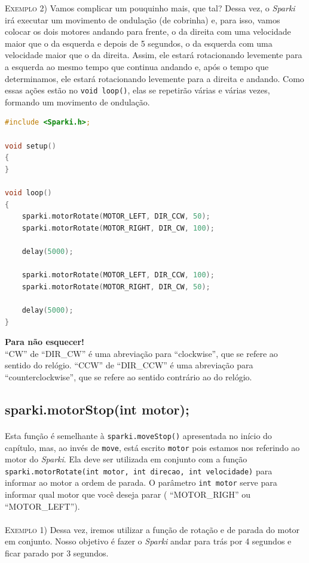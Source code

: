 \textsc{Exemplo 2)} Vamos complicar um pouquinho mais, que tal? Dessa vez, o \textsl{Sparki} irá executar um movimento de ondulação (de cobrinha) e, para isso, vamos colocar os dois motores andando para frente, o da direita com uma velocidade maior que o da esquerda e depois de 5 segundos, o da esquerda com uma velocidade maior que o da direita. Assim, ele estará rotacionando levemente para a esquerda ao mesmo tempo que continua andando e, após o tempo que determinamos, ele estará rotacionando levemente para a direita e andando. Como essas ações estão no \lstinline[columns=fixed]{void loop()}, elas se repetirão várias e várias vezes, formando um movimento de ondulação.

    \begin{lstlisting}[language=C]
#include <Sparki.h>;

void setup()
{
}

void loop()
{
    sparki.motorRotate(MOTOR_LEFT, DIR_CCW, 50);
    sparki.motorRotate(MOTOR_RIGHT, DIR_CW, 100);
    
    delay(5000);
    
    sparki.motorRotate(MOTOR_LEFT, DIR_CCW, 100);
    sparki.motorRotate(MOTOR_RIGHT, DIR_CW, 50);
    
    delay(5000);
}
\end{lstlisting}

\begin{center}
    \textcolor{mydarkblue}{\textbf{Para não esquecer!}}
    \\``CW'' de ``DIR\_CW'' é uma abreviação para ``clockwise'', que se refere ao sentido do relógio. ``CCW'' de ``DIR\_CCW'' é uma abreviação para ``counterclockwise'', que se refere ao sentido contrário ao do relógio.
\end{center}

\subsection{sparki.motorStop(int motor);}
\paragraph{}
Esta função é semelhante à \lstinline[columns=fixed]{sparki.moveStop()} apresentada no início do capítulo, mas, ao invés de \lstinline[columns=fixed]{move}, está escrito \lstinline[columns=fixed]{motor} pois estamos nos referindo ao motor do \textsl{Sparki}. Ela deve ser utilizada em conjunto com a função \lstinline[columns=fixed]{sparki.motorRotate(int motor, int direcao, int velocidade)} para informar ao motor a ordem de parada. O parâmetro \lstinline[columns=fixed]{int motor} serve para informar qual motor que você deseja parar ( ``MOTOR\_RIGH'' ou ``MOTOR\_LEFT'').
\\~\\
\textsc{Exemplo 1)} Dessa vez, iremos utilizar a função de rotação e de parada do motor em conjunto. Nosso objetivo é fazer o \textsl{Sparki} andar para trás por 4 segundos e ficar parado por 3 segundos.
        
